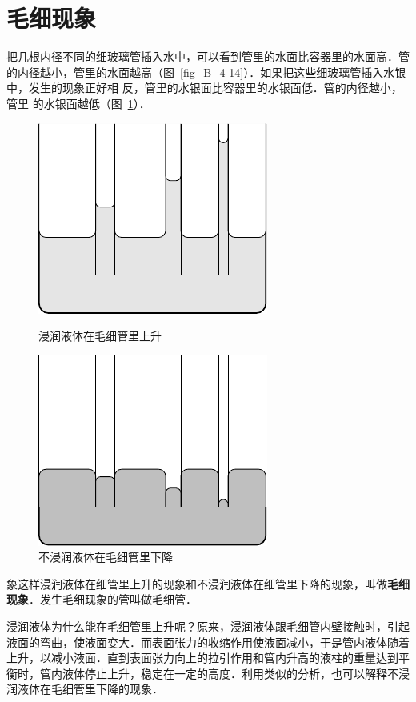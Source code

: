 \section{毛细现象}
把几根内径不同的细玻璃管插入水中，可以看到管里的水面比容器里的水面高．管的内径越小，管里的水面越高（图~\ref{fig_B_4-14}）．如果把这些细玻璃管插入水银中，发生的现象正好相
反，管里的水银面比容器里的水银面低．管的内径越小，管里
的水银面越低（图~\ref{fig_B_4-15}）．
\begin{figure}[htbp]
    \centering
    \begin{minipage}[t]{0.48\textwidth}
        \centering
        \includegraphics{fig/B/4-14.pdf}
        \caption{浸润液体在毛细管里上升}\label{fig_B_4-14}
    \end{minipage}
    \hfil
    \begin{minipage}[t]{0.48\textwidth}
        \centering
        \includegraphics{fig/B/4-15.pdf}
        \caption{不浸润液体在毛细管里下降}\label{fig_B_4-15}
    \end{minipage}
\end{figure}

象这样浸润液体在细管里上升的现象和不浸润液体在细管里下降的现象，叫做\textbf{毛细现象}．发生毛细现象的管叫做毛细管．

浸润液体为什么能在毛细管里上升呢？原来，浸润液体跟毛细管内壁接触时，引起液面的弯曲，使液面变大．而表面张力的收缩作用使液面减小，于是管内液体随着上升，以减小液面．直到表面张力向上的拉引作用和管内升高的液柱的重量达到平衡时，管内液体停止上升，稳定在一定的高度．利用类似的分析，也可以解释不浸润液体在毛细管里下降的现象．


